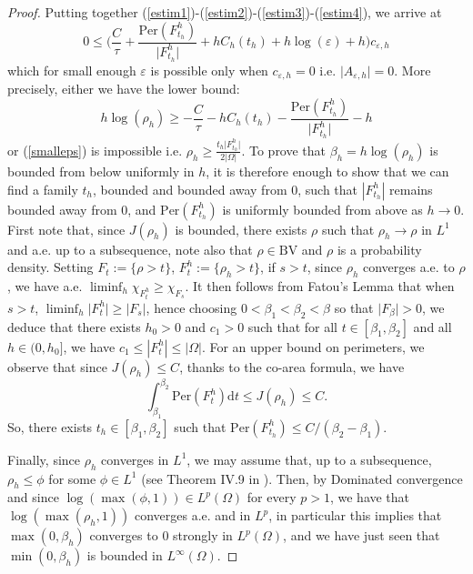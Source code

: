 \documentclass[12pt, a4paper]{article}
\numberwithin{equation}{section}
\theoremstyle{plain}
\theoremstyle{definition}
\theoremstyle{remark}
\newcommand\eps{\varepsilon}
\newcommand{\BV}{\mathrm{BV}}
\newcommand{\Per}{\mathrm{Per}}
\newcommand\pref[1]{(\ref{#1})}
\begin{document}
\begin{proof}
Putting together (\ref{estim1})-(\ref{estim2})-(\ref{estim3})-(\ref{estim4}), we  arrive at
\[0\le \Big(\frac{C}{\tau}+  \frac{\Per(F_{t_h}^h)}{\vert F_{t_h}^h\vert} +  h C_h(t_h)+ h   \log( \eps) +h \Big) c_{\eps,h}\]
which for small enough $\eps$ is possible only when $c_{\eps, h}=0$ i.e. $\vert A_{\eps,h}\vert=0$.  More precisely, either we have the lower bound:
\begin{equation}
\label{boundbelowteta}
 h \log(\rho_h) \ge -\frac{C}{\tau}-h C_h(t_h)- \frac{\Per(F_{t_h}^h)}{\vert F_{t_h}^h\vert} -h
\end{equation}
or \pref{smalleps} is impossible i.e.  $\rho_h \ge \frac{t_h \vert F_{t_h}^h \vert }{2\vert \Omega\vert}$. To prove that $\beta_h=h \log(\rho_h)$ is bounded from below uniformly in $h$, it is therefore enough to show that we can find a family $t_h$, bounded and bounded away from $0$,  such that $|F_{t_h}^h|$ remains bounded away from $0$, and $\mathrm{Per}(F_{t_h}^h)$ is uniformly bounded from above as $h\to 0$. First note that, since $J(\rho_h)$ is bounded,  there exists $\rho$ such that $\rho_h \to \rho$ in $L^1$ and a.e. up to a subsequence, note also that $\rho\in  \BV$ and $\rho$ is a probability density. Setting  $F_t:=\{\rho >t\}$, $F_t^h:=\{\rho_h >t\}$, if $s>t$, since $\rho_h$ converges a.e. to $\rho$, we have a.e.  $\liminf_h \chi_{F_t^h} \ge \chi_{F_s}$. It then follows from Fatou's Lemma that when $s>t$, $\liminf_h \vert F_t^h \vert \ge \vert F_s\vert$, hence  choosing    $0<\beta_1 <\beta_2<\beta$ so that $\vert F_{\beta} \vert >0$, we deduce that there exists $h_0>0$ and  $c_1>0$ such that for all $t\in [\beta_1,\beta_2]$ and all $h\in (0, h_0]$, we have  $c_1 \leq |F_t^{h} | \leq \vert \Omega\vert$. For an upper bound on perimeters, we observe that since  $J(\rho_h) \leq C$, thanks to the co-area formula, we have
$$
\int_{\beta_1}^{\beta_2}\Per(F_t^h) \mathrm{d}t\leq J(\rho_h)\leq C.
$$
So, there exists $t_h\in [\beta_1,\beta_2]$ such that
$
\Per(F_{t_h}^h)\leq C/(\beta_2-\beta_1).
$


\smallskip

Finally, since $\rho_h$ converges in $L^1$,  we may assume that, up to a subsequence, $\rho_h \le \phi$ for some $\phi \in L^1$ (see Theorem IV.9 in \cite{Brezis}). Then, by Dominated convergence and since $\log(\max(\phi,1))\in L^p(\Omega)$ for every $p>1$, we have that $\log(\max(\rho_h,1))$ converges a.e. and in $L^p$, in particular this implies that $\max(0, \beta_h)$ converges to $0$ strongly in $L^p(\Omega)$, and we have just seen that $\min(0, \beta_h)$ is bounded in $L^\infty( \Omega)$. 


\end{proof} 
\end{document}
